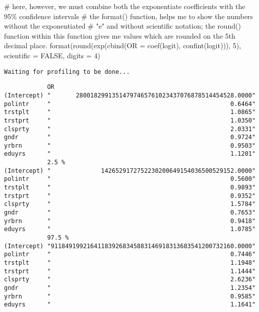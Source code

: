 \documentclass[
  letterpaper,
  DIV=11,
  numbers=noendperiod]{scrreprt}
\newenvironment{Shaded}{\begin{snugshade}}{\end{snugshade}}
\newcommand{\AttributeTok}[1]{\textcolor[rgb]{0.40,0.45,0.13}{#1}}
\newcommand{\CommentTok}[1]{\textcolor[rgb]{0.37,0.37,0.37}{#1}}
\newcommand{\ConstantTok}[1]{\textcolor[rgb]{0.56,0.35,0.01}{#1}}
\newcommand{\DecValTok}[1]{\textcolor[rgb]{0.68,0.00,0.00}{#1}}
\newcommand{\FunctionTok}[1]{\textcolor[rgb]{0.28,0.35,0.67}{#1}}
\newcommand{\NormalTok}[1]{\textcolor[rgb]{0.00,0.23,0.31}{#1}}
\begin{document}
\begin{Shaded}
\begin{Highlighting}[]
\CommentTok{\# here, however, we must combine both the exponentiate coefficients with the 95\% confidence intervals}
\CommentTok{\# the format() function, helps me to show the numbers without the exponentiated }
\CommentTok{\# "e" and without scientific notation; the round() function within this function gives me values which are rounded on the 5th decimal place.}
\FunctionTok{format}\NormalTok{(}\FunctionTok{round}\NormalTok{(}\FunctionTok{exp}\NormalTok{(}\FunctionTok{cbind}\NormalTok{(}\AttributeTok{OR =} \FunctionTok{coef}\NormalTok{(logit), }\FunctionTok{confint}\NormalTok{(logit))), }\DecValTok{5}\NormalTok{), }
       \AttributeTok{scientific =} \ConstantTok{FALSE}\NormalTok{, }\AttributeTok{digits =} \DecValTok{4}\NormalTok{)}
\end{Highlighting}
\end{Shaded}

\begin{verbatim}
Waiting for profiling to be done...
\end{verbatim}

\begin{verbatim}
            OR                                                        
(Intercept) "       28001829913514797465761023437076878514454528.0000"
polintr     "                                                  0.6464"
trstplt     "                                                  1.0865"
trstprt     "                                                  1.0350"
clsprty     "                                                  2.0331"
gndr        "                                                  0.9724"
yrbrn       "                                                  0.9503"
eduyrs      "                                                  1.1201"
            2.5 %                                                     
(Intercept) "              1426529172752230200649154036500529152.0000"
polintr     "                                                  0.5600"
trstplt     "                                                  0.9893"
trstprt     "                                                  0.9352"
clsprty     "                                                  1.5784"
gndr        "                                                  0.7653"
yrbrn       "                                                  0.9418"
eduyrs      "                                                  1.0785"
            97.5 %                                                    
(Intercept) "911849199216411839268345883146918313683541200732160.0000"
polintr     "                                                  0.7446"
trstplt     "                                                  1.1948"
trstprt     "                                                  1.1444"
clsprty     "                                                  2.6236"
gndr        "                                                  1.2354"
yrbrn       "                                                  0.9585"
eduyrs      "                                                  1.1641"
\end{verbatim}
\end{document}
